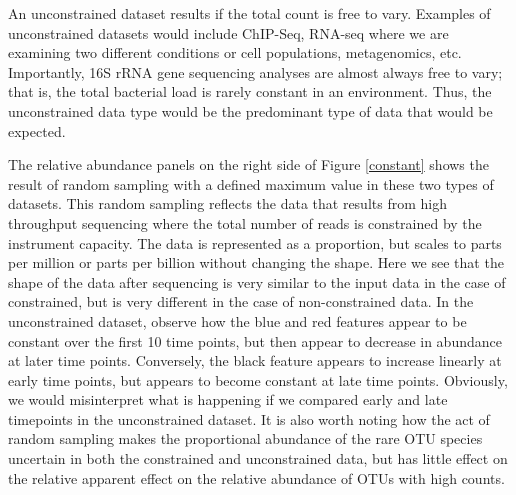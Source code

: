\documentclass[11pt]{article}\usepackage[]{graphicx}\usepackage[]{color}
\begin{document}
An unconstrained dataset  results if the total count is free to vary. Examples of unconstrained datasets would include ChIP-Seq, RNA-seq where we are examining two  different conditions or cell populations, metagenomics, etc. Importantly, 16S rRNA gene sequencing analyses are almost always free to vary; that is, the total bacterial load is rarely constant in an environment. Thus, the unconstrained data type would be the predominant type of data that would be expected.

The relative abundance panels on the right side of Figure \ref{constant} shows the result of random sampling with a defined maximum value in these two types of datasets. This random sampling reflects the data that results from high throughput sequencing where the total number of reads is constrained by the instrument capacity. The data is represented as a proportion, but  scales to parts per million or parts per billion  without changing the shape. Here we see that the shape of the data after sequencing is very similar to the input data in the case of constrained, but is very different in the case of non-constrained data. In the unconstrained dataset, observe how the blue and red features appear to be constant over the first 10 time points, but then appear to decrease in abundance at later time points. Conversely, the black feature appears to increase linearly at early time points, but appears to become constant at  late time points. Obviously, we would misinterpret what is happening if we compared early and late timepoints in the unconstrained dataset. It is also worth noting how the act of random sampling makes the proportional abundance of the rare OTU species uncertain in both the constrained and unconstrained data, but has little effect on the relative apparent effect on the relative abundance of OTUs with high counts.

\end{document}
